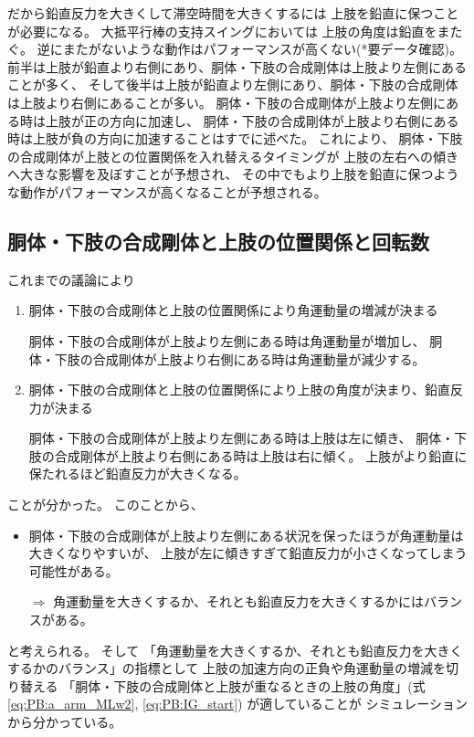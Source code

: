 \documentclass[a4paper,11pt]{jsarticle}
\begin{document}
だから鉛直反力を大きくして滞空時間を大きくするには
上肢を鉛直に保つことが必要になる。
大抵平行棒の支持スイングにおいては
上肢の角度は鉛直をまたぐ。
逆にまたがないような動作はパフォーマンスが高くない(*要データ確認)。
前半は上肢が鉛直より右側にあり、胴体・下肢の合成剛体は上肢より左側にあることが多く、
そして後半は上肢が鉛直より左側にあり、胴体・下肢の合成剛体は上肢より右側にあることが多い。
胴体・下肢の合成剛体が上肢より左側にある時は上肢が正の方向に加速し、
胴体・下肢の合成剛体が上肢より右側にある時は上肢が負の方向に加速することはすでに述べた。
これにより、
胴体・下肢の合成剛体が上肢との位置関係を入れ替えるタイミングが
上肢の左右への傾きへ大きな影響を及ぼすことが予想され、
その中でもより上肢を鉛直に保つような動作がパフォーマンスが高くなることが予想される。

\subsection{胴体・下肢の合成剛体と上肢の位置関係と回転数}
これまでの議論により
\begin{enumerate}
  \item 胴体・下肢の合成剛体と上肢の位置関係により角運動量の増減が決まる
  
  胴体・下肢の合成剛体が上肢より左側にある時は角運動量が増加し、
  胴体・下肢の合成剛体が上肢より右側にある時は角運動量が減少する。
  \item 胴体・下肢の合成剛体と上肢の位置関係により上肢の角度が決まり、鉛直反力が決まる
  
  胴体・下肢の合成剛体が上肢より左側にある時は上肢は左に傾き、
  胴体・下肢の合成剛体が上肢より右側にある時は上肢は右に傾く。
  上肢がより鉛直に保たれるほど鉛直反力が大きくなる。
\end{enumerate}
ことが分かった。
このことから、
\begin{itemize}
  \item 胴体・下肢の合成剛体が上肢より左側にある状況を保ったほうが角運動量は大きくなりやすいが、
  上肢が左に傾きすぎて鉛直反力が小さくなってしまう可能性がある。

  $\Rightarrow$ 角運動量を大きくするか、それとも鉛直反力を大きくするかにはバランスがある。
\end{itemize}
と考えられる。
そして
「角運動量を大きくするか、それとも鉛直反力を大きくするかのバランス」の指標として
上肢の加速方向の正負や角運動量の増減を切り替える
「胴体・下肢の合成剛体と上肢が重なるときの上肢の角度」(式\ref{eq:PB:a_arm_MLw2}, \ref{eq:PB:IG_start})
が適していることが
シミュレーションから分かっている。
\end{document}
